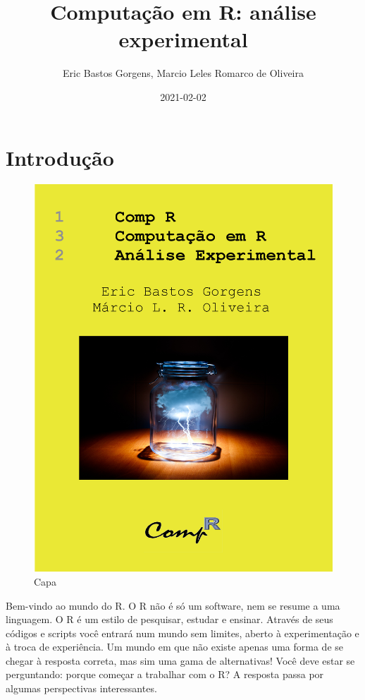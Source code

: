 \documentclass[
]{article}
\title{Computação em R: análise experimental}
\author{Eric Bastos Gorgens, Marcio Leles Romarco de Oliveira}
\date{2021-02-02}
\begin{document}
\maketitle

{
\setcounter{tocdepth}{2}
\tableofcontents
}
\hypertarget{introduuxe7uxe3o}{%
\section{Introdução}\label{introduuxe7uxe3o}}

\begin{figure}
\centering
\includegraphics{./figuras/capa.png}
\caption{Capa}
\end{figure}

Bem-vindo ao mundo do R. O R não é só um software, nem se resume a uma linguagem. O R é um estilo de pesquisar, estudar e ensinar. Através de seus códigos e scripts você entrará num mundo sem limites, aberto à experimentação e à troca de experiência. Um mundo em que não existe apenas uma forma de se chegar à resposta correta, mas sim uma gama de alternativas! Você deve estar se perguntando: porque começar a trabalhar com o R? A resposta passa por algumas perspectivas interessantes.
\end{document}
